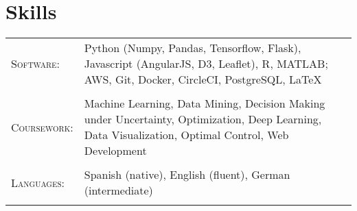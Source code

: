 \documentclass[a4paper,10pt]{article}
\begin{document}











\section{Skills}
\begin{tabularx}{\textwidth}{lX}
\textsc{Software:}& Python (Numpy, Pandas, Tensorflow, Flask), Javascript (AngularJS, D3, Leaflet), R, MATLAB; AWS, Git, Docker, CircleCI, PostgreSQL, \LaTeX \\ \\ 

 \textsc{Coursework:}& Machine Learning, Data Mining, Decision Making under Uncertainty, Optimization, Deep Learning, Data Visualization, Optimal Control, Web Development\\ \\ 

 \textsc{Languages:}& Spanish (native), English (fluent), German (intermediate)\\ \\ 
\end{tabularx}

\nocite{*}


\end{document}
